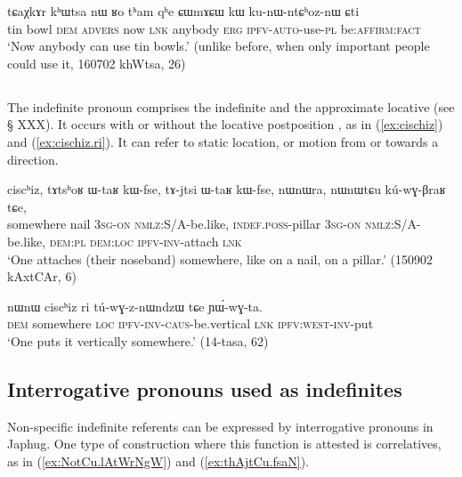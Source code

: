  \begin{exe}
\ex \label{ex:CWmACW.kW}
\gll tɕaχkɤr kʰɯtsa nɯ ʁo tʰam qʰe ɕɯmɤɕɯ kɯ ku-nɯ-ntɕʰoz-nɯ ɕti \\
tin bowl \textsc{dem} \textsc{advers} now \textsc{lnk} anybody \textsc{erg} \textsc{ipfv-auto}-use-\textsc{pl} be:\textsc{affirm:fact} \\
\glt `Now anybody can use tin bowls.' (unlike before, when only important people could use it, 160702 khWtsa, 26)
 \end{exe}
 
  \subsection{}
The indefinite pronoun  comprises the indefinite  and the approximate locative  (see § XXX). It occurs with or without the locative postposition , as in (\ref{ex:cischiz}) and (\ref{ex:cischiz.ri}). It can refer to static location, or motion from or towards a direction.

 \begin{exe}
\ex \label{ex:cischiz}
\gll
ciscʰiz, tɤtsʰoʁ ɯ-taʁ kɯ-fse, tɤ-jtsi ɯ-taʁ kɯ-fse, nɯnɯra, nɯnɯtɕu kú-wɣ-βraʁ tɕe, \\
somewhere nail \textsc{3sg-on} \textsc{nmlz}:S/A-be.like, \textsc{indef.poss}-pillar \textsc{3sg-on} \textsc{nmlz}:S/A-be.like,  \textsc{dem:pl} \textsc{dem:loc} \textsc{ipfv-inv}-attach \textsc{lnk} \\
\glt `One attaches (their noseband) somewhere, like on a nail, on a pillar.' (150902 kAxtCAr, 6)
 \end{exe}
 
 \begin{exe}
\ex \label{ex:cischiz.ri}
\gll nɯnɯ ciscʰiz ri tú-wɣ-z-nɯndzɯ tɕe ɲɯ́-wɣ-ta.\\
\textsc{dem} somewhere  \textsc{loc} \textsc{ipfv-inv-caus}-be.vertical \textsc{lnk} \textsc{ipfv:west-inv}-put\\
\glt `One puts it vertically somewhere.' (14-tasa, 62)
 \end{exe}
  
 
\subsection{Interrogative pronouns used as indefinites} \label{sec:interrogative.indef}
Non-specific indefinite referents can be expressed by interrogative pronouns in Japhug. One type of construction where this function is attested is correlatives, as in (\ref{ex:NotCu.lAtWrNgW}) and (\ref{ex:thAjtCu.fsaN}).
 
